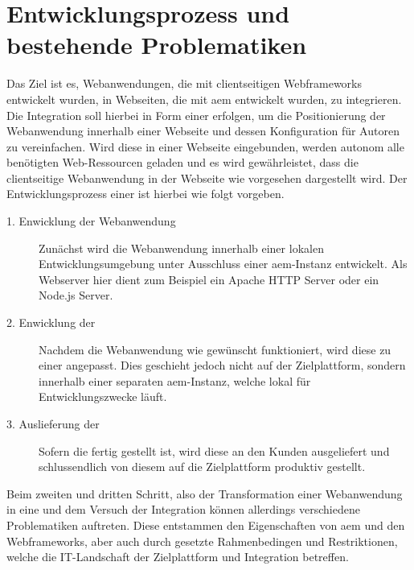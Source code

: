 \section{Entwicklungsprozess und bestehende Problematiken}
Das Ziel ist es, Webanwendungen, die mit clientseitigen Webframeworks entwickelt wurden, in Webseiten, die mit \ac{aem} entwickelt wurden, zu integrieren. Die Integration soll hierbei in Form einer \ajc erfolgen, um die Positionierung der Webanwendung innerhalb einer Webseite und dessen Konfiguration für Autoren zu vereinfachen. Wird diese in einer Webseite eingebunden, werden autonom alle benötigten Web-Ressourcen geladen und es wird gewährleistet, dass die clientseitige Webanwendung in der Webseite wie vorgesehen dargestellt wird. Der Entwicklungsprozess einer \ajc ist hierbei wie folgt vorgeben.

\begin{description}
	\item[1. Enwicklung der Webanwendung] Zunächst wird die Webanwendung innerhalb einer lokalen Entwicklungsumgebung unter Ausschluss einer \ac{aem}-Instanz entwickelt. Als Webserver hier dient zum Beispiel ein Apache HTTP Server oder ein Node.js Server.
	\item[2. Enwicklung der \ajc] Nachdem die Webanwendung wie gewünscht funktioniert, wird diese zu einer \ajc angepasst. Dies geschieht jedoch nicht auf der Zielplattform, sondern innerhalb einer separaten \ac{aem}-Instanz, welche lokal für Entwicklungszwecke läuft.
	\item[3. Auslieferung der \ajc] Sofern die \ajc fertig gestellt ist, wird diese an den Kunden ausgeliefert und schlussendlich von diesem auf die Zielplattform produktiv gestellt.
\end{description}



Beim zweiten und dritten Schritt, also der Transformation einer Webanwendung in eine \ajc und dem Versuch der Integration können allerdings verschiedene Problematiken auftreten. Diese entstammen den Eigenschaften von \ac{aem} und den Webframeworks, aber auch durch gesetzte Rahmenbedingen und Restriktionen, welche die IT-Landschaft der Zielplattform und Integration betreffen. 




